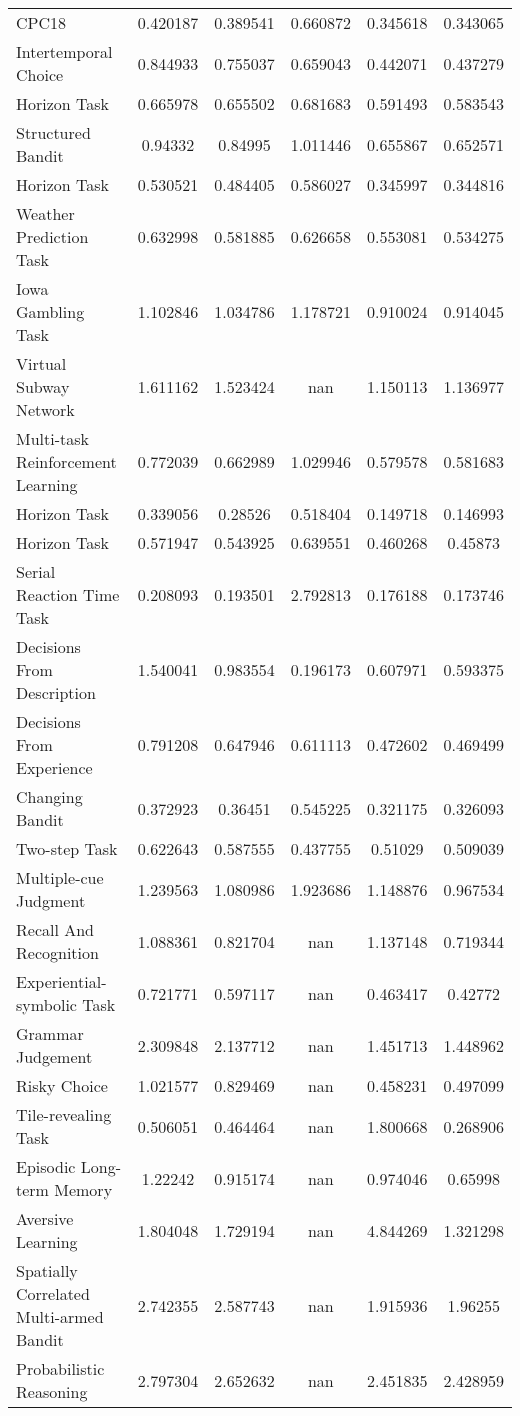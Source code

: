 \begin{table}[th]
{\begin{tabular}{l|c|c|c|c|c}
CPC18 & 0.420187 & 0.389541 & 0.660872 & 0.345618 & 0.343065 \\
Intertemporal Choice & 0.844933 & 0.755037 & 0.659043 & 0.442071 & 0.437279 \\
Horizon Task & 0.665978 & 0.655502 & 0.681683 & 0.591493 & 0.583543 \\
Structured Bandit & 0.94332 & 0.84995 & 1.011446 & 0.655867 & 0.652571 \\
Horizon Task & 0.530521 & 0.484405 & 0.586027 & 0.345997 & 0.344816 \\
Weather Prediction Task & 0.632998 & 0.581885 & 0.626658 & 0.553081 & 0.534275 \\
Iowa Gambling Task & 1.102846 & 1.034786 & 1.178721 & 0.910024 & 0.914045 \\
Virtual Subway Network & 1.611162 & 1.523424 & nan & 1.150113 & 1.136977 \\
Multi-task Reinforcement Learning & 0.772039 & 0.662989 & 1.029946 & 0.579578 & 0.581683 \\
Horizon Task & 0.339056 & 0.28526 & 0.518404 & 0.149718 & 0.146993 \\
Horizon Task & 0.571947 & 0.543925 & 0.639551 & 0.460268 & 0.45873 \\
Serial Reaction Time Task & 0.208093 & 0.193501 & 2.792813 & 0.176188 & 0.173746 \\
Decisions From Description & 1.540041 & 0.983554 & 0.196173 & 0.607971 & 0.593375 \\
Decisions From Experience & 0.791208 & 0.647946 & 0.611113 & 0.472602 & 0.469499 \\
Changing Bandit & 0.372923 & 0.36451 & 0.545225 & 0.321175 & 0.326093 \\
Two-step Task & 0.622643 & 0.587555 & 0.437755 & 0.51029 & 0.509039 \\
Multiple-cue Judgment & 1.239563 & 1.080986 & 1.923686 & 1.148876 & 0.967534 \\
Recall And Recognition & 1.088361 & 0.821704 & nan & 1.137148 & 0.719344 \\
Experiential-symbolic Task & 0.721771 & 0.597117 & nan & 0.463417 & 0.42772 \\
Grammar Judgement & 2.309848 & 2.137712 & nan & 1.451713 & 1.448962 \\
Risky Choice & 1.021577 & 0.829469 & nan & 0.458231 & 0.497099 \\
Tile-revealing Task & 0.506051 & 0.464464 & nan & 1.800668 & 0.268906 \\
Episodic Long-term Memory & 1.22242 & 0.915174 & nan & 0.974046 & 0.65998 \\
Aversive Learning & 1.804048 & 1.729194 & nan & 4.844269 & 1.321298 \\
Spatially Correlated Multi-armed Bandit & 2.742355 & 2.587743 & nan & 1.915936 & 1.96255 \\
Probabilistic Reasoning & 2.797304 & 2.652632 & nan & 2.451835 & 2.428959 \\
\bottomrule 
\end{tabular}
}
\end{table}